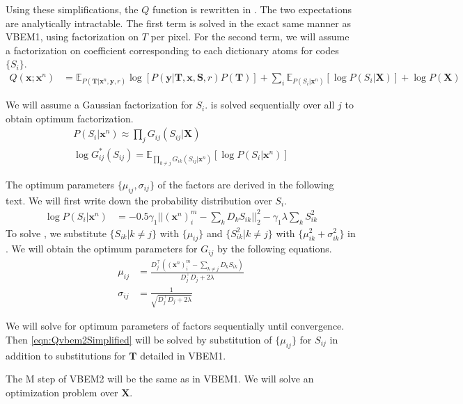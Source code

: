 Using these simplifications, the $Q$ function is rewritten in . The two expectations are analytically intractable. The first term is solved in the exact same manner as VBEM1, using factorization on $T$ per pixel. For the second term, we will assume a factorization on coefficient corresponding to each dictionary atoms for codes $\lbrace S_i \rbrace$.
\begin{align}
 Q(\mathbf{x}; \mathbf{x}^n) &= \mathbb{E}_{ P \left( \mathbf{T} | \mathbf{x}^n, \mathbf{y}, r \right)} \log \left[ P \left( \mathbf{y} | \mathbf{T}, \mathbf{x}, \mathbf{S}, r \right)  P \left( \mathbf{T} \right) \right] + \sum_i \mathbb{E}_{ P \left( S_i | \mathbf{x}^n \right)} \left[ \log P \left( S_i | \mathbf{X} \right) \right] + \log P \left( \mathbf{X} \right) \label{eqn:Qvbem2Simplified}
\end{align}


We will assume a Gaussian factorization for $S_i$.  is solved sequentially over all $j$ to obtain optimum factorization.
\begin{align}
    P \left( S_i | \mathbf{x}^n \right) \approx \prod_{j} G_{ij} (S_{ij} | \mathbf{X}) \label{eqn:factVbem2} \\
    \log G_{ij}^* \left( S_{ij} \right) = \mathbb{E}_{ \prod_{k \neq j} G_{ik} \left( S_{ij} | \mathbf{x}^n \right) } \left[ \log P \left( S_i | \mathbf{x}^n \right)\right] \label{eqn:solveVbem2}
\end{align}

The optimum parameters $\lbrace \mu_{ij}, \sigma_{ij} \rbrace$ of the factors are derived in the following text. We will first write down the probability distribution over $S_i$.
\begin{align}
    \log P \left( S_i | \mathbf{x}^n \right) &= -0.5 \gamma_1 || \left( \mathbf{x}^n \right)_i^m - \sum_k D_k S_{ik} ||_2^2 - \gamma_1 \lambda \sum_k S_{ik}^2 \label{eqn:derive1Vbem2}
\end{align}
To solve , we substitute $\lbrace S_{ik} | k \neq j\rbrace$ with $\lbrace \mu_{ij} \rbrace$ and $\lbrace S_{ik}^2 | k \neq j\rbrace$ with $\lbrace \mu_{ik}^2 + \sigma_{ik}^2 \rbrace$ in . We will obtain the optimum parameters for $G_{ij}$ by the following equations.
\begin{align}
    \mu_{ij} &= \frac{ D_j^\intercal \left( \left(\mathbf{x}^n\right)_i^m - \sum_{k \neq j} D_k S_{ik} \right) }{ D_j^\intercal D_j + 2 \lambda } \\
    \sigma_{ij} &= \frac{1}{\sqrt{ D_j^\intercal D_j + 2 \lambda }}
\end{align} 

We will solve for optimum parameters of factors sequentially until convergence. Then \ref{eqn:Qvbem2Simplified} will be solved by substitution of $\lbrace \mu_{ij} \rbrace$ for $S_{ij}$ in addition to substitutions for $\mathbf{T}$ detailed in VBEM1.

The M step of VBEM2 will be the same as in VBEM1. We will solve an optimization problem over $\mathbf{X}$.


